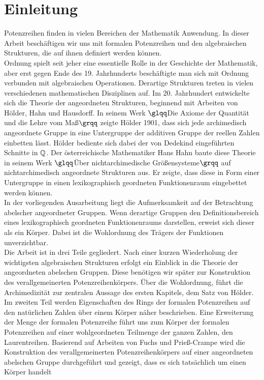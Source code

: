 \chapter{Einleitung}
%
Potenzreihen finden in vielen Bereichen der Mathematik Anwendung. In dieser Arbeit beschäftigen wir uns mit formalen Potenzreihen und den algebraischen Strukturen, die auf ihnen definiert werden können. \\
Ordnung spielt seit jeher eine essentielle Rolle in der Geschichte der Mathematik, aber erst gegen Ende des 19. Jahrhunderts beschäftigte man sich mit Ordnung verbunden mit algebraischen Operationen. Derartige Strukturen treten in vielen verschiedenen mathematischen Disziplinen auf. Im 20. Jahrhundert entwickelte sich die Theorie der angeordneten Strukturen, beginnend mit Arbeiten von Hölder, Hahn und Hausdorff. In seinem Werk $\glqq$Die Axiome der Quantität und die Lehre vom Maß$\grqq$ zeigte Hölder 1901, dass sich jede archimedisch angeordnete Gruppe in eine Untergruppe der additiven Gruppe der reellen Zahlen einbetten lässt. Hölder bediente sich dabei der von Dedekind eingeführten Schnitte in $\mathbb{Q}$. Der österreichische Mathematiker Hans Hahn baute diese Theorie in seinem Werk $\glqq$Über nichtarchimedische Größensysteme$\grqq$ auf nichtarchimedisch angeordnete Strukturen aus. Er zeigte, dass diese in Form einer Untergruppe in einen lexikographisch geordneten Funktionenraum eingebettet werden können. \\
In der vorliegenden Ausarbeitung liegt die Aufmerksamkeit auf der Betrachtung abelscher angeordneter Gruppen. Wenn derartige Gruppen den Definitionsbereich eines lexikographisch geordneten Funktionenraums darstellen, erweist sich dieser als ein Körper. Dabei ist die Wohlordnung des Trägers der Funktionen unverzichtbar.  \\
Die Arbeit ist in drei Teile gegliedert. Nach einer kurzen Wiederholung der wichtigsten algebraischen Strukturen erfolgt ein Einblick in die Theorie der angeordneten abelschen Gruppen. Diese benötigen wir später zur Konstruktion des verallgemeinerten Potenzreihenkörpers. Über die Wohlordnung, führt die Archimedizität zur zentralen Aussage des ersten Kapitels, dem Satz von Hölder. Im zweiten Teil werden Eigenschaften des Rings der formalen Potenzreihen auf den natürlichen Zahlen über einem Körper näher beschrieben. Eine Erweiterung der Menge der formalen Potenzreihe führt uns zum Körper der formalen Potenzreihen auf einer wohlgeordneten Teilmenge der ganzen Zahlen, den Laurentreihen. Basierend auf Arbeiten von Fuchs und Prieß-Crampe wird die Konstruktion des verallgemeinerten Potenzreihenkörpers auf einer angeordneten abelschen Gruppe durchgeführt und gezeigt, dass es sich tatsächlich um einen Körper handelt




